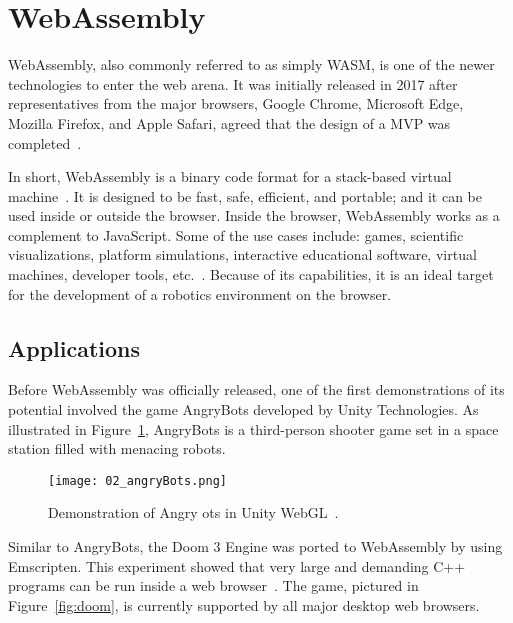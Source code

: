 \section{WebAssembly}

    WebAssembly, also commonly referred to as simply WASM, is one of the newer technologies to enter the web arena. It was initially released in 2017 after representatives from the major browsers, Google Chrome, Microsoft Edge, Mozilla Firefox, and Apple Safari, agreed that the design of a \ac{MVP} was completed~\cite{krill}.

    In short, WebAssembly is a binary code format for a stack-based virtual machine~\cite{wasmspec}. It is designed to be fast, safe, efficient, and portable; and it can be used inside or outside the browser. Inside the browser, WebAssembly works as a complement to JavaScript. Some of the use cases include: games, scientific visualizations, platform simulations, interactive educational software, virtual machines, developer tools, etc.~\cite{wasmdocs}. Because of its capabilities, it is an ideal target for the development of a robotics environment on the browser.

        


    \subsection{Applications}

        Before WebAssembly was officially released, one of the first demonstrations of its potential involved the game AngryBots developed by Unity Technologies. As illustrated in Figure~\ref{fig:unity}, AngryBots is a third-person shooter game set in a space station filled with menacing robots.

        \begin{figure}[htbp]
            \centering
            \texttt{[image: 02\_angryBots.png]}
            \caption{Demonstration of Angry ots in Unity WebGL~\cite{angrybots}.}\label{fig:unity}
        \end{figure}

        Similar to AngryBots, the Doom 3 Engine was ported to WebAssembly by using Emscripten. This experiment showed that very large and demanding C++ programs can be run inside a web browser~\cite{doom3}. The game, pictured in Figure~\ref{fig:doom}, is currently supported by all major desktop web browsers.

